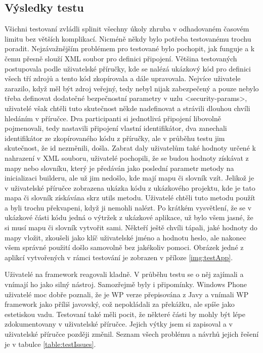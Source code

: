 \subsection{Výsledky testu}
Všichni testovaní zvládli splinit všechny úkoly zhruba v odhadovaném časovém limitu bez větších komplikací. Nicméně někdy bylo potřeba testovanému trochu poradit. Nejzávažnějším problémem pro testované bylo pochopit, jak funguje a k čemu přesně slouží XML soubor pro definici připojení. Většina testovaných postupovala podle uživatelské příručky, kde se nalézá ukázkový kód pro definici všech tří zdrojů a tento kód zkopírovala a dále upravovala. Nejvíce uživatele zarazilo, když měl být zdroj veřejný, tedy nebyl nijak zabezpečený a pouze nebylo třeba definovat dodatečné bezpečnostní parametry v uzlu <security-params>, uživatelé však chtěli tuto skutečnost někde nadefinovat a strávili dlouhou chvíli hledáním v příručce. Dva participanti si jednotlivá připojení libovolně pojmenovali, tedy nastavili připojení vlastní identifikátor, dva zanechali identifikátor ze zkopírovaného kódu z příručky, ale v průběhu testu jim skutečnost, že id nezměnili, došla. Zabrat daly uživatelům také hodnoty určené k nahrazení v XML souboru, uživatelé pochopili, že se budou hodnoty získávat z mapy nebo slovníku, který je předáván jako poslední parametr metody na inicializaci builderu, ale už jim nedošlo, kde mají mapu či slovník vzít. Jelikož je v uživatelské příručce zobrazena ukázka kódu z ukázkového projektu, kde je tato mapa či slovník získávána skrz utils metodu. Uživatelé chtěli tuto metodu použít a byli trochu překvapeni, když ji nemohli nalézt. Po krátkém vysvětlení, že se v ukázkové části kódu jedná o výtržek z ukázkové aplikace, už bylo všem jasné, že si musí mapu či slovník vytvořit sami. Někteří ještě chvíli tápali, jaké hodnoty do mapy vložit, zkoušeli jako klíč uživatelské jméno a hodnotu heslo, ale nakonec všem správné použití došlo samovolně bez jakékoliv pomoci. Obrázek jedné z aplikcí vytvořených v rámci testování je zobrazen v příloze \ref{img:testApp}.

Uživatelé na framework reagovali kladně. V průběhu testu se o něj zajímali a vnímají ho jako silný nástroj. Samozřejmě byly i připomínky. Windows Phone uživatelé moc dobře poznali, že je WP verze přepisována z Javy a vnímali WP framework jako příliš javovský, což nepokládali za překážku, ale spíše jako estetiskou vadu. Testovaní také měli pocit, že některé části by mohly být lépe zdokumentovany v uživatelské příručce. Jejich výtky jsem si zapisoval a v uživatelské příručce později změnil. Seznam všech problému a návrhů jejich řešení je v tabulce \ref{table:testIssues}.

